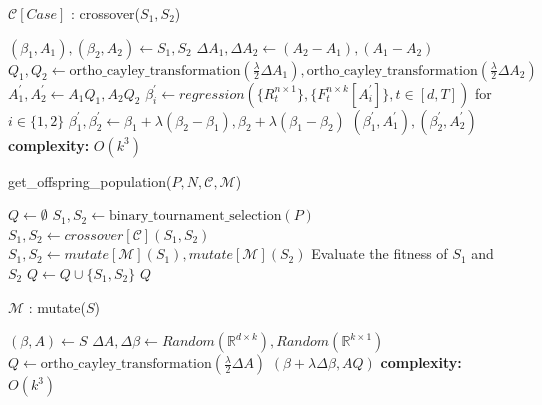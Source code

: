 \begin{algorithm}[H]
\caption{$\mathcal{C}[Case]$ : crossover($S_1,S_2$)}\label{nsga2:crossover_1}
\begin{algorithmic}[1]
\State $(\beta_1, A_1), (\beta_2, A_2)\gets S_1, S_2$
\State $\Delta A_1, \Delta A_2 \gets (A_2-A_1), (A_1-A_2)$
\State $Q_1, Q_2 \gets \text{ortho\_cayley\_transformation}(\frac{\lambda}{2} \Delta A_1), \text{ortho\_cayley\_transformation}(\frac{\lambda}{2} \Delta A_2)$
\State $A^{'}_1, A^{'}_2\gets A_1Q_1, A_2Q_2$
\State $\beta^{'}_i \gets regression(\{R^{n\times 1}_{t}\},\{F^{n\times k}_{t}[A^{'}_i]\}, t\in [d,T])$ for $i\in \{1,2\}$
\Else{}
\State $\beta^{'}_1, \beta^{'}_2 \gets \beta_1 + \lambda(\beta_2-\beta_1), \beta_2 + \lambda(\beta_1-\beta_2)$
\EndIf
\State \Return $(\beta^{'}_1,A^{'}_1),(\beta^{'}_2,A^{'}_2)$
\State \textbf{complexity: } $O(k^3)$
\end{algorithmic}
\end{algorithm}

\begin{algorithm}[H]
\caption{get\_offspring\_population($P,N,\mathcal{C},\mathcal{M}$)}\label{nsga2:generate_offspring_population}
\begin{algorithmic}[1]
\State $Q \gets \emptyset$
\State $S_1, S_2 \gets \text{binary\_tournament\_selection}(P)$ 
\State $S_1, S_2 \gets crossover[\mathcal{C}](S_1,S_2) $
\EndIf
{}
\State $S_1, S_2 \gets mutate[\mathcal{M}](S_1),mutate[\mathcal{M}](S_2) $
\EndIf
\State Evaluate the fitness of $S_1$ and $S_2$
\State $Q \gets Q \cup \{S_1, S_2\}$
\EndFor
\State \Return $Q$
\end{algorithmic}
\end{algorithm}

\begin{algorithm}[H]
\caption{$\mathcal{M}$ : mutate($S$)}\label{nsga2:mutate_1}
\begin{algorithmic}[1]
\State $(\beta, A)\gets S$
\State $\Delta A, \Delta \beta \gets Random(\mathbb{R}^{d\times k}),Random(\mathbb{R}^{k\times 1})$
\State $Q \gets \text{ortho\_cayley\_transformation}(\frac{\lambda}{2} \Delta A)$
\State \Return $(\beta + \lambda \Delta \beta, AQ)$
\State \textbf{complexity: } $O(k^3)$
\end{algorithmic}
\end{algorithm}

